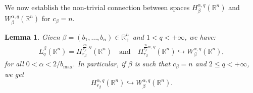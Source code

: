 \documentclass[10pt, leqno]{article}
\newtheorem{lemma}[theorem]{Lemma}
\theoremstyle{definition}
\theoremstyle{remark}
\numberwithin{equation}{section}
\begin{document}
We now establish the non-trivial connection between spaces $H_{\beta}^{\alpha, q}(\mathbb{R}^{n})$ and $W_{\beta}^{\alpha, q}(\mathbb{R}^{n})$ for $c_{\beta} = n$.
\begin{lemma}
\label{Main. Lemma}
Given $\beta=\left( b_{1},\dots, b_{n} \right) \in \mathbb{R}^{n}_{+}$ and $1 < q < +\infty$, we have:
\begin{eqnarray}
\label{Main. Lemma 1}
L^{\beta}_{q}(\mathbb{R}^{n}) = H_{r_{\beta^{}}}^{\frac{2n}{c_{\beta}}, q}(\mathbb{R}^{n}) \quad \text{and} \quad H_{r_{\beta^{}}}^{\frac{n}{c_{\beta}} \alpha, q}(\mathbb{R}^{n}) \hookrightarrow W_{\beta}^{\alpha, q}(\mathbb{R}^{n}),
\end{eqnarray}
for all $0 < \alpha < 2/b_{\max}$. In particular, if $\beta$ is such that $c_{\beta} = n$ and $2 \leq q < +\infty$, we get
$$
H_{r_{\beta^{}}}^{\alpha, q}(\mathbb{R}^{n}) \hookrightarrow W_{\beta}^{\alpha, q}(\mathbb{R}^{n}).
$$
\end{lemma}
\end{document}
